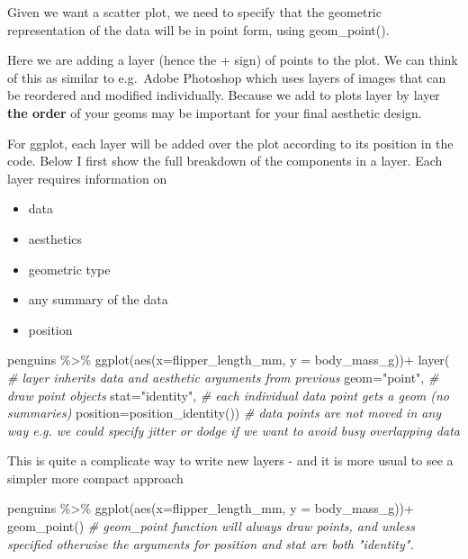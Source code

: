\documentclass[
]{book}
\newenvironment{Shaded}{\begin{snugshade}}{\end{snugshade}}
\newcommand{\AttributeTok}[1]{\textcolor[rgb]{0.77,0.63,0.00}{#1}}
\newcommand{\CommentTok}[1]{\textcolor[rgb]{0.56,0.35,0.01}{\textit{#1}}}
\newcommand{\FunctionTok}[1]{\textcolor[rgb]{0.00,0.00,0.00}{#1}}
\newcommand{\NormalTok}[1]{#1}
\newcommand{\SpecialCharTok}[1]{\textcolor[rgb]{0.00,0.00,0.00}{#1}}
\newcommand{\StringTok}[1]{\textcolor[rgb]{0.31,0.60,0.02}{#1}}
\providecommand{\tightlist}{%
  \setlength{\itemsep}{0pt}\setlength{\parskip}{0pt}}
\begin{document}
Given we want a scatter plot, we need to specify that the geometric representation of the data will be in point form, using geom\_point().

Here we are adding a layer (hence the + sign) of points to the plot. We can think of this as similar to e.g.~Adobe Photoshop which uses layers of images that can be reordered and modified individually. Because we add to plots layer by layer \textbf{the order} of your geoms may be important for your final aesthetic design.

For ggplot, each layer will be added over the plot according to its position in the code. Below I first show the full breakdown of the components in a layer. Each layer requires information on

\begin{itemize}
\tightlist
\item
  data
\item
  aesthetics
\item
  geometric type
\item
  any summary of the data
\item
  position
\end{itemize}

\begin{Shaded}
\begin{Highlighting}[]
\NormalTok{penguins }\SpecialCharTok{\%\textgreater{}\%} 
  \FunctionTok{ggplot}\NormalTok{(}\FunctionTok{aes}\NormalTok{(}\AttributeTok{x=}\NormalTok{flipper\_length\_mm, }
             \AttributeTok{y =}\NormalTok{ body\_mass\_g))}\SpecialCharTok{+}
  \FunctionTok{layer}\NormalTok{(                }\CommentTok{\# layer inherits data and aesthetic arguments from previous}
    \AttributeTok{geom=}\StringTok{"point"}\NormalTok{,       }\CommentTok{\# draw point objects}
    \AttributeTok{stat=}\StringTok{"identity"}\NormalTok{,    }\CommentTok{\# each individual data point gets a geom (no summaries)}
    \AttributeTok{position=}\FunctionTok{position\_identity}\NormalTok{()) }\CommentTok{\# data points are not moved in any way e.g. we could specify jitter or dodge if we want to avoid busy overlapping data}
\end{Highlighting}
\end{Shaded}

This is quite a complicate way to write new layers - and it is more usual to see a simpler more compact approach

\begin{Shaded}
\begin{Highlighting}[]
\NormalTok{penguins }\SpecialCharTok{\%\textgreater{}\%} 
  \FunctionTok{ggplot}\NormalTok{(}\FunctionTok{aes}\NormalTok{(}\AttributeTok{x=}\NormalTok{flipper\_length\_mm, }
             \AttributeTok{y =}\NormalTok{ body\_mass\_g))}\SpecialCharTok{+}
  \FunctionTok{geom\_point}\NormalTok{() }\CommentTok{\# geom\_point function will always draw points, and unless specified otherwise the arguments for position and stat are both "identity".}
\end{Highlighting}
\end{Shaded}
\end{document}
